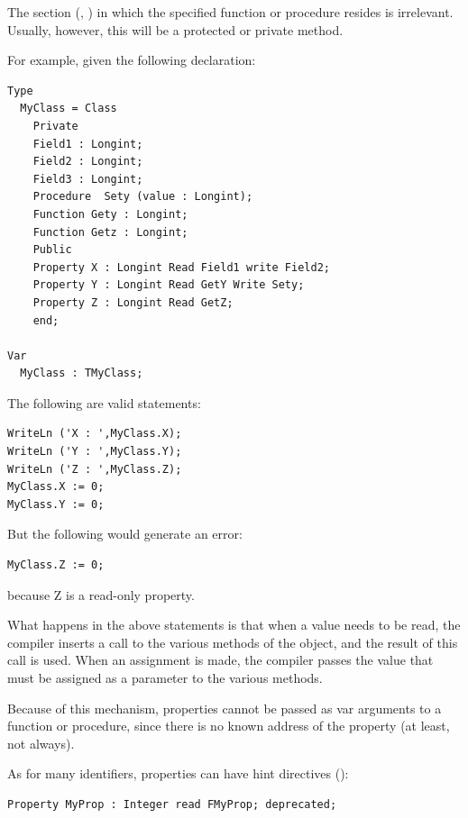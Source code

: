 The section  (, )
in which the specified function or procedure resides is irrelevant. Usually,
however, this will be a protected or private method.

For example, given the following declaration:
\begin{verbatim}
Type
  MyClass = Class
    Private
    Field1 : Longint;
    Field2 : Longint;
    Field3 : Longint;
    Procedure  Sety (value : Longint);
    Function Gety : Longint;
    Function Getz : Longint;
    Public
    Property X : Longint Read Field1 write Field2;
    Property Y : Longint Read GetY Write Sety;
    Property Z : Longint Read GetZ;
    end;

Var
  MyClass : TMyClass;
\end{verbatim}
The following are valid statements:
\begin{verbatim}
WriteLn ('X : ',MyClass.X);
WriteLn ('Y : ',MyClass.Y);
WriteLn ('Z : ',MyClass.Z);
MyClass.X := 0;
MyClass.Y := 0;
\end{verbatim}
But the following would generate an error:
\begin{verbatim}
MyClass.Z := 0;
\end{verbatim}
because Z is a read-only property.

What happens in the above statements is that when a value needs to be read,
the compiler inserts a call to the various  methods of the
object, and the result of this call is used. When an assignment is made,
the compiler passes the value that must be assigned as a parameter to
the various  methods.

Because of this mechanism, properties cannot be passed as var arguments to a
function or procedure, since there is no known address of the property (at
least, not always).

As for many identifiers, properties can have hint directives
():
\begin{verbatim}
Property MyProp : Integer read FMyProp; deprecated; 
\end{verbatim}


